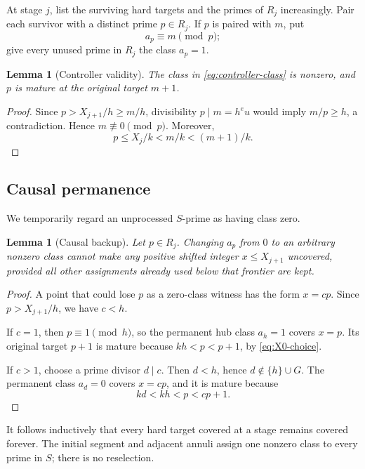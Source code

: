 \documentclass[10pt]{amsart}
\numberwithin{equation}{section}
\newtheorem{lemma}[theorem]{Lemma}
\theoremstyle{remark}
\begin{document}
At stage \(j\), list the surviving hard targets and the primes of \(R_j\)
increasingly. Pair each survivor with a distinct prime \(p\in R_j\). If
\(p\) is paired with \(m\), put
\begin{equation}\label{eq:controller-class}
 a_p\equiv m\pmod p;
\end{equation}
give every unused prime in \(R_j\) the class \(a_p=1\).

\begin{lemma}[Controller validity]\label{lem:controller}
The class in \eqref{eq:controller-class} is nonzero, and \(p\) is mature at
the original target \(m+1\).
\end{lemma}

\begin{proof}
Since \(p>X_{j+1}/h\ge m/h\), divisibility \(p\mid m=h^eu\) would imply
\(m/p\ge h\), a contradiction. Hence \(m\not\equiv0\pmod p\). Moreover,
\[
 p\le X_j/k<m/k<(m+1)/k.
\]
\end{proof}

\subsection{Causal permanence}

We temporarily regard an unprocessed \(S\)-prime as having class zero.

\begin{lemma}[Causal backup]\label{lem:backup}
Let \(p\in R_j\). Changing \(a_p\) from \(0\) to an arbitrary nonzero
class cannot make any positive shifted integer \(x\le X_{j+1}\) uncovered,
provided all other assignments already used below that frontier are kept.
\end{lemma}

\begin{proof}
A point that could lose \(p\) as a zero-class witness has the form \(x=cp\).
Since \(p>X_{j+1}/h\), we have \(c<h\).

If \(c=1\), then \(p\equiv1\pmod h\), so the permanent hub class \(a_h=1\)
covers \(x=p\). Its original target \(p+1\) is mature because
\(kh<p<p+1\), by \eqref{eq:X0-choice}.

If \(c>1\), choose a prime divisor \(d\mid c\). Then \(d<h\), hence
\(d\notin\{h\}\cup G\). The permanent class \(a_d=0\) covers \(x=cp\),
and it is mature because
\[
 kd<kh<p<cp+1.
\]
\end{proof}

It follows inductively that every hard target covered at a stage remains
covered forever. The initial segment and adjacent annuli assign one nonzero
class to every prime in \(S\); there is no reselection.
\end{document}
